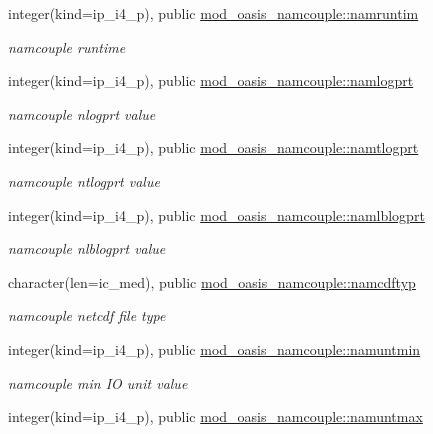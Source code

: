 \begin{DoxyCompactItemize}
integer(kind=ip\+\_\+i4\+\_\+p), public \hyperlink{namespacemod__oasis__namcouple_a14505eaa91b2c8ba308c63ff78652206}{mod\+\_\+oasis\+\_\+namcouple\+::namruntim}
\begin{DoxyCompactList}\small\item\em namcouple runtime \end{DoxyCompactList}\item 
integer(kind=ip\+\_\+i4\+\_\+p), public \hyperlink{namespacemod__oasis__namcouple_a46affda5336f60a1eeb1badaaccd3cfd}{mod\+\_\+oasis\+\_\+namcouple\+::namlogprt}
\begin{DoxyCompactList}\small\item\em namcouple nlogprt value \end{DoxyCompactList}\item 
integer(kind=ip\+\_\+i4\+\_\+p), public \hyperlink{namespacemod__oasis__namcouple_a45fbbd2941f5d71991d409f63e31cf02}{mod\+\_\+oasis\+\_\+namcouple\+::namtlogprt}
\begin{DoxyCompactList}\small\item\em namcouple ntlogprt value \end{DoxyCompactList}\item 
integer(kind=ip\+\_\+i4\+\_\+p), public \hyperlink{namespacemod__oasis__namcouple_ac2f9ee614d937824f48d80313f878d31}{mod\+\_\+oasis\+\_\+namcouple\+::namlblogprt}
\begin{DoxyCompactList}\small\item\em namcouple nlblogprt value \end{DoxyCompactList}\item 
character(len=ic\+\_\+med), public \hyperlink{namespacemod__oasis__namcouple_a6fc58f1e9018344a1d5f99e6767d1bda}{mod\+\_\+oasis\+\_\+namcouple\+::namcdftyp}
\begin{DoxyCompactList}\small\item\em namcouple netcdf file type \end{DoxyCompactList}\item 
integer(kind=ip\+\_\+i4\+\_\+p), public \hyperlink{namespacemod__oasis__namcouple_a1b8c7ce28c62fa0b15076b7169d8b454}{mod\+\_\+oasis\+\_\+namcouple\+::namuntmin}
\begin{DoxyCompactList}\small\item\em namcouple min IO unit value \end{DoxyCompactList}\item 
integer(kind=ip\+\_\+i4\+\_\+p), public \hyperlink{namespacemod__oasis__namcouple_ae750107f9401fd3c7348088ad3095b45}{mod\+\_\+oasis\+\_\+namcouple\+::namuntmax}

\end{DoxyCompactItemize}

